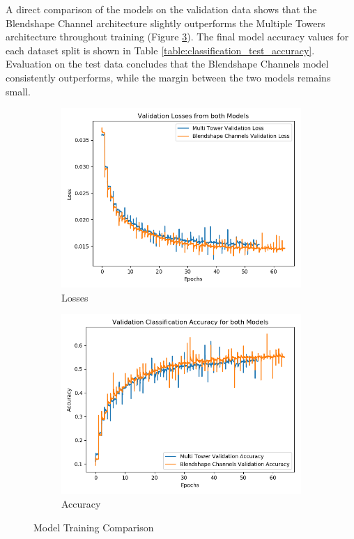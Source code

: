 A direct comparison of the models on the validation data shows that the Blendshape Channel architecture slightly outperforms the Multiple Towers architecture throughout training (Figure \ref{fig:classification_training}).
The final model accuracy values for each dataset split is shown in Table \ref{table:classification_test_accuracy}.
Evaluation on the test data concludes that the Blendshape Channels model consistently outperforms, while the margin between the two models remains small.

\begin{figure}[h!]
    \centering
    \begin{subfigure}[b]{0.49\textwidth}
        \includegraphics[width=\textwidth]{figures/classification/both_models_val_loss.png}
        \caption{Losses}\label{fig:both_models_val_loss}
    \end{subfigure}
    \begin{subfigure}[b]{0.49\textwidth}
        \includegraphics[width=\textwidth]{figures/classification/both_models_val_acc.png}
        \caption{Accuracy}\label{fig:both_models_val_acc}
    \end{subfigure}
    \caption{Model Training Comparison}\label{fig:classification_training}
\end{figure}

